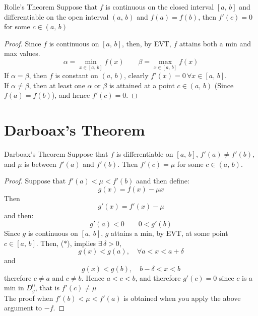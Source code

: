 \documentclass{article}
\renewcommand{\a}{\alpha}
\renewcommand{\b}{\beta}
\renewcommand{\d}{\delta}
\newcommand{\ex}{\exists\,}
\begin{document}
\noindent\begin{theorem}{Rolle's Theorem}{}
   Suppose that $f$ is continuous on the closed interval $[a, \, b]$ and differentiable on the open interval $(a, \, b)$ and $f(a) = f(b)$, then $f'(c) = 0$ for some $c\in (a,\,b)$
\end{theorem}\vspace{10pt}

\begin{figure}[H]
  \centering
\end{figure}
\begin{proof}
  Since $f$ is continuous on $[a,\, b]$, then, by EVT, $f$ attains both a min and max values.
  $$ \a = \min_{x\in [a,\,b]}{f(x)} \qquad \b = \max_{x\in [a,\,b]}{f(x)} $$
  If $\a = \b$, then $f$ is constant on $(a,\, b)$, clearly $f'(x) = 0 \,\forall x\in [a,\, b]$.\\
  If $\a \neq \b$, then at least one $\a$ or $\b$ is attained at a point $c\in (a,\, b)$ (Since $f(a) = f(b)$), and hence $f'(c) = 0$.
\end{proof}

\section{Darboax's Theorem}


\noindent\begin{theorem}{Darboax's Theorem}{}
  Suppose that $f$ is differentiable on $[a,\, b]$, $f'(a)\neq f'(b)$, and $\mu$ is between $f'(a)$ and $f'(b)$. Then $f'(c) = \mu$ for some $c\in (a,\, b)$.
\end{theorem}\vspace{10pt}
\begin{proof}
  Suppose that $f'(a) < \mu < f'(b)$ aand then define:
  $$ g(x) = f(x) - \mu x $$
  Then
  $$ g'(x) = f'(x) - \mu $$
  and then:
  \begin{equation}
    g'(a) < 0 \qquad 0 < g'(b) \tag{$*$}
  \end{equation}
  Since $g$ is continuous on $[a,\, b]$, $g$ attains a min, by EVT, at some point $c\in [a,\, b]$. Then, ($*$), implies $\ex \d > 0$,
  $$ g(x) < g(a), \quad\forall a < x < a + \d $$
  and
  $$ g(x) < g(b), \quad b - \d < x < b $$
  therefore $c\neq a$ and $c \neq b$. Hence $a < c < b$, and therefore $g'(c) = 0$ since $c$ is a min in $D_g^0$, that is $f'(c)\neq \mu$\\
  The proof when $f'(b)<\mu < f'(a)$ is obtained when you apply the above argument to $-f$.
\end{proof}
\end{document}
